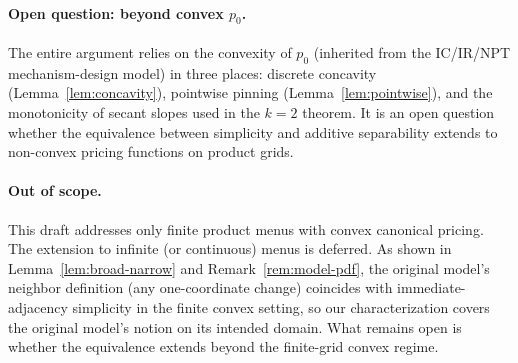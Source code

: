 \documentclass[11pt]{article}
\begin{document}
\paragraph{Open question: beyond convex $p_0$.}
The entire argument relies on the convexity of $p_0$ (inherited from the
IC/IR/NPT mechanism-design model) in three places:
discrete concavity (Lemma~\ref{lem:concavity}),
pointwise pinning (Lemma~\ref{lem:pointwise}), and
the monotonicity of secant slopes used in the $k=2$ theorem.
It is an open question whether the equivalence between simplicity and
additive separability extends to non-convex pricing functions on product grids.

\paragraph{Out of scope.}
This draft addresses only finite product menus with convex canonical
pricing.  The extension to infinite (or continuous) menus is deferred.
As shown in Lemma~\ref{lem:broad-narrow} and
Remark~\ref{rem:model-pdf}, the original model's neighbor definition
(any one-coordinate change) coincides with immediate-adjacency
simplicity in the finite convex setting, so our characterization
covers the original model's notion on its intended domain.
What remains open is whether the equivalence extends beyond the
finite-grid convex regime.
\end{document}
